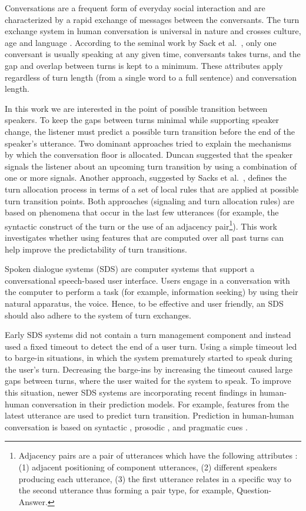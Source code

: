 Conversations are a frequent form of everyday social interaction and are characterized by a rapid exchange of messages between the conversants.
The turn exchange system in human conversation is universal in nature and crosses culture, age and language \cite{levinson2016turn}. According to the
seminal work by Sack et al.~\cite{sacks1974simplest},
%
only one conversant is usually speaking at any given time,
%
conversants takes turns, and the gap and overlap between turns is kept to a minimum. These attributes apply regardless of turn length (from a single word to a full sentence) and conversation length.

In this work we are interested in the point of possible transition between speakers. To keep the gaps between turns minimal while supporting speaker change, the listener
must predict a possible turn transition before the end of the speaker's utterance. Two dominant approaches tried to explain the mechanisms by which
the conversation floor is allocated. Duncan \cite{duncan1972some} suggested that the speaker signals the listener about an upcoming turn transition by using a combination of one or more signals.
Another approach, suggested by Sacks et al.~\cite{sacks1974simplest}, defines the turn allocation process in terms of a set of local rules that are applied at possible turn transition points.
Both approaches (signaling and turn allocation rules) are based on phenomena that occur in the last few utterances (for example, the syntactic construct of the turn or the use of an adjacency pair\footnote{Adjacency pairs are a pair of utterances which have the following attributes
\cite{Schegloff1973-SCHOUC}: (1) adjacent positioning of component utterances, (2) different speakers producing each utterance, (3) the first utterance relates in a specific way to the second utterance thus forming a pair type, for example, Question-Answer.}). This work investigates whether using features that are computed over all past turns can help improve the predictability of turn transitions.

Spoken dialogue systems (SDS) are computer systems that support a conversational speech-based user interface. Users engage in a conversation with the computer to
perform a task (for example, information seeking) by using their natural apparatus, the voice. Hence, to be effective and user friendly, an SDS should also adhere to the system of turn exchanges.

Early SDS systems did not contain a turn management component and instead used a fixed timeout to detect the end of a user turn. Using a simple timeout led to barge-in situations, in which the system prematurely started to speak during the user's turn. Decreasing the barge-ins by increasing the timeout caused large gaps between turns, where the user waited for the system to speak.
To improve this situation, newer SDS systems are incorporating recent findings in human-human conversation in their prediction models. For example, features from the latest utterance are used to predict turn transition. Prediction in human-human conversation is based on syntactic \cite{sacks1974simplest,de2006projecting}, prosodic  \cite{ford1996interactional,stolcke2002speaker,ferrer2003prosody}, and pragmatic cues  \cite{ford2001intersection}.

